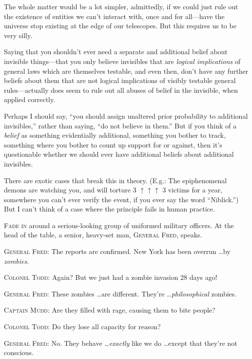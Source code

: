 {
 The whole matter would be a lot simpler, admittedly, if we could
just rule out the existence of entities we can't
interact with, once and for all---have the universe stop existing at
the edge of our telescopes. But this requires us to be very silly.}

{
 Saying that you shouldn't ever need a separate and
additional belief about invisible things---that you only believe
invisibles that are \textit{logical implications} of general laws which
are themselves testable, and even then, don't have any
further beliefs about them that are not logical implications of visibly
testable general rules---actually does seem to rule out all abuses of
belief in the invisible, when applied correctly.}

{
 Perhaps I should say, ``you should assign
unaltered prior probability to additional
invisibles,'' rather than saying,
``do not believe in them.'' But if
you think of a \textit{belief} as something evidentially additional,
something you bother to track, something where you bother to count up
support for or against, then it's questionable whether
we should ever have additional beliefs about additional invisibles.}

{
 There are exotic cases that break this in theory. (E.g.: The
epiphenomenal demons are watching you, and will torture 3 $\uparrow
\uparrow \uparrow $ 3 victims for a year, somewhere you
can't ever verify the event, if you ever say the word
``Niblick.'') But I
can't think of a case where the principle fails in
human practice.}

\myendsectiontext


{
 \textsc{Fade in} around a serious-looking group of uniformed military
 officers. At the head of the table, a senior, heavy-set man,
 \textsc{General Fred}, speaks.}

{
 \textsc{General Fred}: The reports are confirmed. New York has been overrun
\ldots by \textit{zombies}.}

{
 \textsc{Colonel Todd}: Again? But we just had a zombie invasion 28 days
ago!}

{
 \textsc{General Fred}: These zombies \ldots are different.
They're \ldots \textit{philosophical} zombies.}

{
 \textsc{Captain Mudd}: Are they filled with rage, causing them to bite
people?}

{
 \textsc{Colonel Todd}: Do they lose all capacity for reason?}

{
 \textsc{General Fred}: No. They behave \ldots \textit{exactly} like we do
\ldots except that they're not conscious.}

